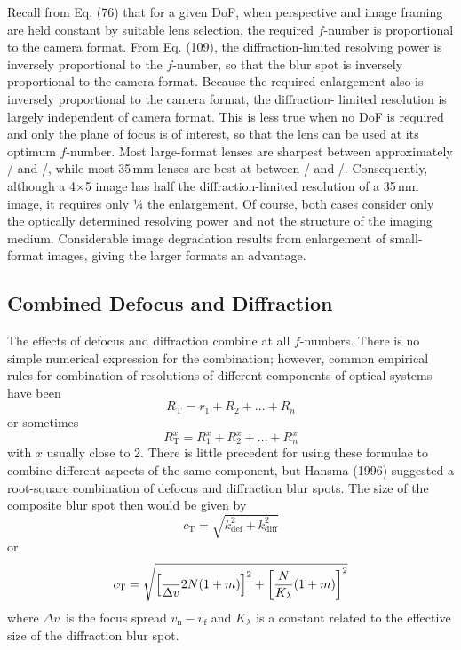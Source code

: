 \documentclass[11pt, oneside]{scrartcl}   	%
\newcommand{\Dv}{\ensuremath{\Delta v}}
\newcommand{\f}[1]{\mbox{\raisebox{2pt}{\footnotesize $f$\hspace{-1.2pt}}/\hspace{-0.6pt}\raisebox{-0.6pt}{\small #1}}}
\begin{document}
Recall from Eq. (76) that for a given DoF, when perspective and
image framing are held constant by suitable lens selection, the
required $f$-number is proportional to the camera format. From
Eq. (109), the diffraction-limited resolving power is inversely
proportional to the $f$-number, so that the blur spot is inversely proportional to the camera format. Because the required enlargement also is inversely proportional to the camera format, the diffraction- limited resolution is largely independent of camera format. This is less true when no DoF is required and only the plane of focus is of interest, so that the lens can be used at its optimum $f$-number. Most large-format lenses are sharpest between approximately \f{16} and \f{22}, while most 35\,mm lenses are best at between \f8 and \f{11}. Consequently, although a 4$\times$5 image has half the diffraction-limited resolution of a 35\,mm image, it requires only 1⁄4 the enlargement. Of course, both cases consider only the optically determined resolving power and not the structure of the imaging medium. Considerable image degradation results from enlargement of small-format images, giving the larger formats an advantage.

\subsection{Combined Defocus and Diffraction}
\label{sec:comb-defoc-diffr}


The effects of defocus and diffraction combine at all
$f$-numbers. There is no simple numerical expression for the
combination; however, common empirical rules for combination of
resolutions of different components of optical systems have been
\begin{equation}
  \label{eq:110}
  R_\mathrm{T}=r_1 + R_2 + \ldots + R_n
\end{equation}
or sometimes
\begin{equation}
  \label{eq:111}
  R^x_\mathrm{T}=R^x_1 + R^x_2 + \ldots + R^x_n
\end{equation}
with $x$ usually close to 2. There is little precedent for using these formulae to combine different aspects of the same component, but Hansma (1996) suggested a root-square combination of defocus and diffraction blur spots. The size of the composite blur spot then would be given by
\begin{equation}
  \label{eq:112}
  c_\mathrm{T}=\sqrt{k^2_\mathrm{def}+k^2_\mathrm{diff}}
\end{equation}
or
\begin{equation}
  \label{eq:113}
  c_\mathrm{T} = \sqrt{ \left[ \frac\Dv{2N(1+m)}\right]^2 + \left[\frac N{K_\lambda}(1+m)\right]^2}
\end{equation}
where \Dv\ is the focus spread $v_\mathrm{n} - v_\mathrm{f}$ and $K_\lambda$ is a constant related to the effective size of the diffraction blur spot.
\end{document}
